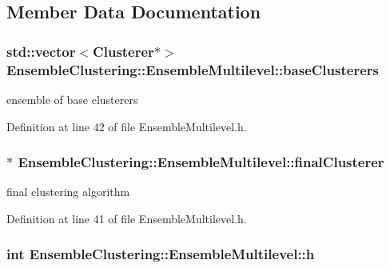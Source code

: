 \subsection{Member Data Documentation}
\hypertarget{class_ensemble_clustering_1_1_ensemble_multilevel_a3cfdea29f6d247ee855ce68ebfbd8945}{
\subsubsection[{base\-Clusterers}]{\setlength{\rightskip}{0pt plus 5cm}std\-::vector$<${\bf Clusterer}$\ast$$>$ Ensemble\-Clustering\-::\-Ensemble\-Multilevel\-::base\-Clusterers\hspace{0.3cm}{\ttfamily [protected]}}}\label{class_ensemble_clustering_1_1_ensemble_multilevel_a3cfdea29f6d247ee855ce68ebfbd8945}


ensemble of base clusterers 



Definition at line 42 of file Ensemble\-Multilevel.\-h.

\hypertarget{class_ensemble_clustering_1_1_ensemble_multilevel_a8fd0edb77e73782397ee3abcd0ef7703}{
\subsubsection[{final\-Clusterer}]{$\ast$ Ensemble\-Clustering\-::\-Ensemble\-Multilevel\-::final\-Clusterer\hspace{0.3cm}{\ttfamily [protected]}}}\label{class_ensemble_clustering_1_1_ensemble_multilevel_a8fd0edb77e73782397ee3abcd0ef7703}


final clustering algorithm 



Definition at line 41 of file Ensemble\-Multilevel.\-h.

\hypertarget{class_ensemble_clustering_1_1_ensemble_multilevel_a326e7cca2b0f70d543c1b71fdb534ee6}{
\subsubsection[{h}]{\setlength{\rightskip}{0pt plus 5cm}int Ensemble\-Clustering\-::\-Ensemble\-Multilevel\-::h\hspace{0.3cm}{\ttfamily [protected]}}}\label{class_ensemble_clustering_1_1_ensemble_multilevel_a326e7cca2b0f70d543c1b71fdb534ee6}


